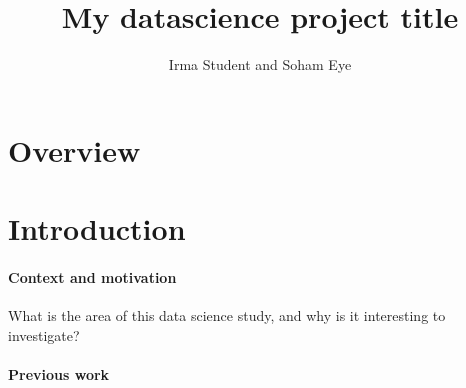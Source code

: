 \documentclass[11pt,a4paper]{article}
\title{My datascience project title}
\author{Irma Student and Soham Eye}
\begin{document}
\maketitle


\section{Overview}

\section{Introduction}

\paragraph{Context and motivation}

What is the area of this data science study, and why is it interesting
to investigate?

\paragraph{Previous work}
\end{document}

